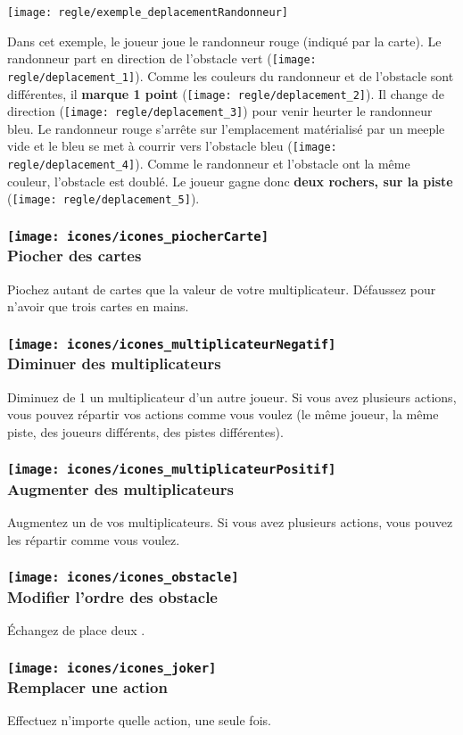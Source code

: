 {    
\texttt{[image: regle/exemple\_deplacementRandonneur]}

Dans cet exemple, le joueur \foudre joue le randonneur rouge (indiqué par la carte). Le randonneur part en direction de l'obstacle vert (\texttt{[image: regle/deplacement\_1]}). Comme les couleurs du randonneur et de l'obstacle sont différentes, il \textbf{marque 1 point} (\texttt{[image: regle/deplacement\_2]}). Il change de direction (\texttt{[image: regle/deplacement\_3]}) pour venir heurter le randonneur bleu. Le randonneur rouge s'arrête sur l'emplacement matérialisé par un meeple vide et le bleu se met à courrir vers l'obstacle bleu (\texttt{[image: regle/deplacement\_4]}). Comme le randonneur et l'obstacle ont la même couleur, l'obstacle est doublé. Le joueur gagne donc \textbf{deux rochers, sur la piste \rocher} (\texttt{[image: regle/deplacement\_5]}).
}
\FloatBarrier


\subsubsection*{\texttt{[image: icones/icones\_piocherCarte]} \\ Piocher des cartes}
Piochez autant de cartes que la valeur de votre multiplicateur. Défaussez pour n'avoir que trois cartes en mains.

\subsubsection*{\texttt{[image: icones/icones\_multiplicateurNegatif]} \\ Diminuer des multiplicateurs}
Diminuez de 1 un multiplicateur d'un autre joueur. Si vous avez plusieurs actions, vous pouvez répartir vos actions comme vous voulez (le même joueur, la même piste, des joueurs différents, des pistes différentes).

\subsubsection*{\texttt{[image: icones/icones\_multiplicateurPositif]} \\ Augmenter des multiplicateurs}
Augmentez un de vos multiplicateurs. Si vous avez plusieurs actions, vous pouvez les répartir comme vous voulez.

\subsubsection*{\texttt{[image: icones/icones\_obstacle]} \\ Modifier l'ordre des obstacle}
Échangez de place deux \marqueursObstacles.

\subsubsection*{\texttt{[image: icones/icones\_joker]} \\ Remplacer une action}
Effectuez n'importe quelle action, une seule fois.